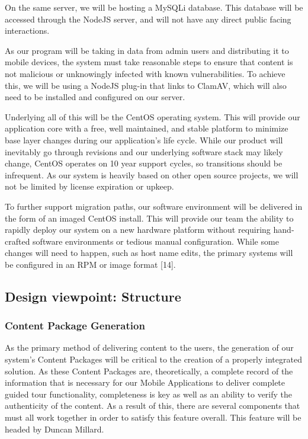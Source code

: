 \documentclass[letterpaper, 10pt,titlepage]{article}
\begin{document}
On the same server, we will be hosting a MySQLi database. This database will be accessed through the NodeJS server, and will not have any direct public facing interactions. 

As our program will be taking in data from admin users and distributing it to mobile devices, the system must take reasonable steps to ensure that content is not malicious or unknowingly infected with known vulnerabilities. To achieve this, we will be using a NodeJS plug-in that links to ClamAV, which will also need to be installed and configured on our server.

Underlying all of this will be the CentOS operating system. This will provide our application core with a free, well maintained, and stable platform to minimize base layer changes during our application’s life cycle. While our product will inevitably go through revisions and our underlying software stack may likely change, CentOS operates on 10 year support cycles, so transitions should be infrequent. As our system is heavily based on other open source projects, we will not be limited by license expiration or upkeep.

To further support migration paths, our software environment will be delivered in the form of an imaged CentOS install. This will provide our team the ability to rapidly deploy our system on a new hardware platform without requiring hand-crafted software environments or tedious manual configuration. While some changes will need to happen, such as host name edits, the primary systems will be configured in an RPM or image format [14].




\subsection{Design viewpoint: Structure}

\subsubsection{Content Package Generation}
As the primary method of delivering content to the users, the generation of our system’s Content Packages will be critical to the creation of a properly integrated solution. As these Content Packages are, theoretically, a complete record of the information that is necessary for our Mobile Applications to deliver complete guided tour functionality, completeness is key as well as an ability to verify the authenticity of the content. As a result of this, there are several components that must all work together in order to satisfy this feature overall. This feature will be headed by Duncan Millard.
\end{document}
